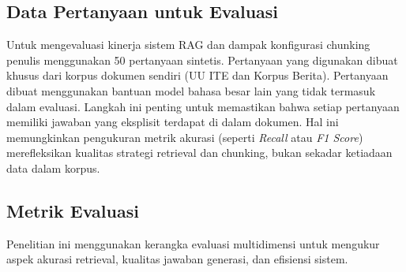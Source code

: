 \subsection{Data Pertanyaan untuk Evaluasi}

Untuk mengevaluasi kinerja sistem RAG dan dampak konfigurasi chunking penulis menggunakan 50 pertanyaan sintetis. Pertanyaan yang digunakan dibuat khusus dari korpus dokumen sendiri (UU ITE dan Korpus Berita). Pertanyaan dibuat menggunakan bantuan model bahasa besar lain yang tidak termasuk dalam evaluasi. Langkah ini penting untuk memastikan bahwa setiap pertanyaan memiliki jawaban yang eksplisit terdapat di dalam dokumen. Hal ini memungkinkan pengukuran metrik akurasi (seperti \textit{Recall} atau \textit{F1 Score}) merefleksikan kualitas strategi retrieval dan chunking, bukan sekadar ketiadaan data dalam korpus. 

\subsection{Metrik Evaluasi}

Penelitian ini menggunakan kerangka evaluasi multidimensi untuk mengukur aspek akurasi retrieval, kualitas jawaban generasi, dan efisiensi sistem. 

